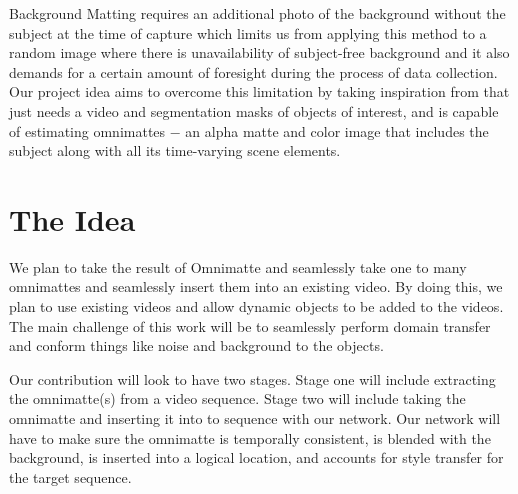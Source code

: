 \documentclass{article}
\begin{document}
Background Matting\cite{BMSengupta20} requires an additional photo of the background without the subject at the time of capture which limits us from applying this method to a random image where there is unavailability of subject-free background and it also demands for a certain amount of foresight during the process of data collection. Our project idea aims to overcome this limitation by taking inspiration from\cite{lu2021} that just needs a video and segmentation masks of objects of interest, and is capable of estimating omnimattes $-$ an alpha matte and color image that includes the subject along with all its time-varying scene elements. 


\section{The Idea}
We plan to take the result of Omnimatte and seamlessly take one to many omnimattes and seamlessly insert them into an existing video. By doing this, we plan to use existing videos and allow dynamic objects to be added to the videos. The main challenge of this work will be to seamlessly perform domain transfer and conform things like noise and background to the objects.


Our contribution will look to have two stages. Stage one will include extracting the omnimatte(s) from a video sequence. Stage two will include taking the omnimatte and inserting it into to sequence with our network. Our network will have to make sure the omnimatte is temporally consistent, is blended with the background, is inserted into a logical location, and accounts for style transfer for the target sequence.
\end{document}
